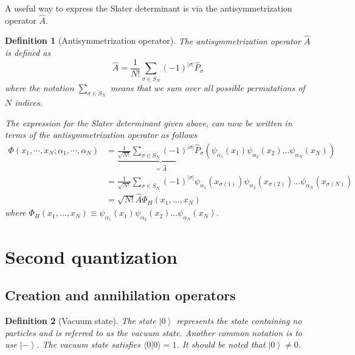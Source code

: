 \documentclass[a4paper,10pt]{article}
\newcommand{\braket}[1]{\langle#1\rangle}
\newcommand{\ket}[1]{\left| #1 \right\rangle} \newcommand{\element}[3]
\theoremstyle{definition}
\newtheorem{definition}{Definition}
\begin{document}
A useful way to express the Slater determinant is via the antisymmetrization operator $\hat{A}$.
\begin{definition}[Antisymmetrization operator]
 The antisymmetrization operator $\hat{A}$ is defined as 
 \begin{equation}
  \hat{A} = \frac{1}{N!} \sum_{\sigma \in S_N} (-1)^{|\sigma|} \hat{P}_\sigma
 \end{equation}
 where the notation 
 $\sum_{\sigma \in S_N}$ means that we sum over all possible permutations of $N$ indices.
 
The expression for the Slater determinant given above, can now be written in terms of the 
antisymmetrization operator as follows
\begin{align}
  \Phi(x_1,\cdots,x_N; \alpha_1,\cdots,\alpha_N) &= \underbrace{\frac{1}{\sqrt{N!}} \sum_{\sigma \in S_N} (-1)^{|\sigma|} \hat{P}_\sigma}_\text{$= \hat{A}$} \left(\psi_{\alpha_1}(x_1) \psi_{\alpha_2}(x_2) \dots \psi_{\alpha_N}(x_N) \right) \nonumber \\
  &= \frac{1}{\sqrt{N!}} \sum_{\sigma \in S_N} (-1)^{|\sigma|}  \psi_{\alpha_1}(x_{\sigma(1)}) \psi_{\alpha_2}(x_{\sigma(2)}) \dots \psi_{\alpha_N}(x_{\sigma(N)}) \nonumber \\
  &= \sqrt{N!} \hat{A} \Phi_H(x_1,\dots,x_N)
\end{align}
where $\Phi_H(x_1,\dots,x_N) \equiv \psi_{\alpha_1}(x_1) \psi_{\alpha_2}(x_2) \dots \psi_{\alpha_N}(x_N)$.
\end{definition}

\section{Second quantization}

\subsection{Creation and annihilation operators}
\begin{definition}[Vacuum state]
 The state $\ket{0}$ represents the state containing no particles and is referred to as
 the vacuum state. Another common notation is to use $\ket{-}$. The vacuum state satisfies 
 $\braket{0|0} = 1$. It should be noted that $\ket{0} \neq 0$.
\end{definition}
\end{document}
